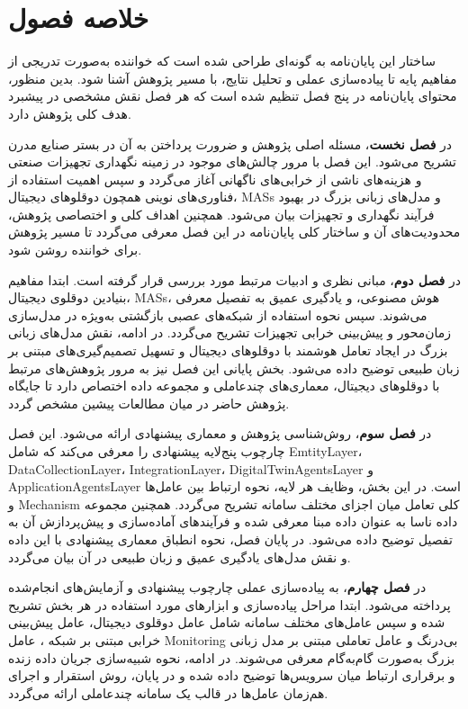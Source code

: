 \documentclass[a4paper,fleqn]{report}
\begin{document}
\section{خلاصه فصول}

ساختار این پایان‌نامه به گونه‌ای طراحی شده است که خواننده به‌صورت تدریجی از مفاهیم پایه تا پیاده‌سازی عملی و تحلیل نتایج، با مسیر پژوهش آشنا شود. بدین منظور، محتوای پایان‌نامه در پنج فصل تنظیم شده است که هر فصل نقش مشخصی در پیشبرد هدف کلی پژوهش دارد.

در \textbf{فصل نخست}، مسئله اصلی پژوهش و ضرورت پرداختن به آن در بستر صنایع مدرن تشریح می‌شود. این فصل با مرور چالش‌های موجود در زمینه نگهداری تجهیزات صنعتی و هزینه‌های ناشی از خرابی‌های ناگهانی آغاز می‌گردد و سپس اهمیت استفاده از فناوری‌های نوینی همچون دوقلوهای دیجیتال، \glspl{MAS} و مدل‌های زبانی بزرگ در بهبود فرآیند نگهداری و 
 تجهیزات بیان می‌شود. همچنین اهداف کلی و اختصاصی پژوهش، محدودیت‌های آن و ساختار کلی پایان‌نامه در این فصل معرفی می‌گردد تا مسیر پژوهش برای خواننده روشن شود.

در \textbf{فصل دوم}، مبانی نظری و ادبیات مرتبط مورد بررسی قرار گرفته است. ابتدا مفاهیم بنیادین دوقلوی دیجیتال، \glspl{MAS}، هوش مصنوعی، و یادگیری عمیق به تفصیل معرفی می‌شوند. سپس نحوه استفاده از شبکه‌های عصبی بازگشتی به‌ویژه  در مدل‌سازی زمان‌محور و پیش‌بینی خرابی تجهیزات تشریح می‌گردد. در ادامه، نقش مدل‌های زبانی بزرگ در ایجاد تعامل هوشمند با دوقلوهای دیجیتال و تسهیل تصمیم‌گیری‌های مبتنی بر زبان طبیعی توضیح داده می‌شود. بخش پایانی این فصل نیز به مرور پژوهش‌های مرتبط با دوقلوهای دیجیتال، معماری‌های چندعاملی و مجموعه داده  اختصاص دارد تا جایگاه پژوهش حاضر در میان مطالعات پیشین مشخص گردد.

در \textbf{فصل سوم}، روش‌شناسی پژوهش و معماری پیشنهادی ارائه می‌شود. این فصل چارچوب پنج‌لایه پیشنهادی را معرفی می‌کند که شامل \gls{EmtityLayer}، \gls{DataCollectionLayer}، \gls{IntegrationLayer}، \gls{DigitalTwinAgentsLayer} و \gls{ApplicationAgentsLayer} است. در این بخش، وظایف هر لایه، نحوه ارتباط بین عامل‌ها و \gls{Mechanism} کلی تعامل میان اجزای مختلف سامانه تشریح می‌گردد. همچنین مجموعه داده  ناسا به عنوان داده مبنا معرفی شده و فرآیندهای آماده‌سازی و پیش‌پردازش آن به تفصیل توضیح داده می‌شود. در پایان فصل، نحوه انطباق معماری پیشنهادی با این داده و نقش مدل‌های یادگیری عمیق و زبان طبیعی در آن بیان می‌گردد.

در \textbf{فصل چهارم}، به پیاده‌سازی عملی چارچوب پیشنهادی و آزمایش‌های انجام‌شده پرداخته می‌شود. ابتدا مراحل پیاده‌سازی و ابزارهای مورد استفاده در هر بخش تشریح شده و سپس عامل‌های مختلف سامانه شامل عامل دوقلوی دیجیتال، عامل پیش‌بینی خرابی مبتنی بر شبکه ، عامل \gls{Monitoring} بی‌درنگ و عامل تعاملی مبتنی بر مدل زبانی بزرگ به‌صورت گام‌به‌گام معرفی می‌شوند. در ادامه، نحوه شبیه‌سازی جریان داده زنده و برقراری ارتباط میان سرویس‌ها توضیح داده شده و در پایان، روش استقرار و اجرای هم‌زمان عامل‌ها در قالب یک سامانه چندعاملی ارائه می‌گردد.
\end{document}
